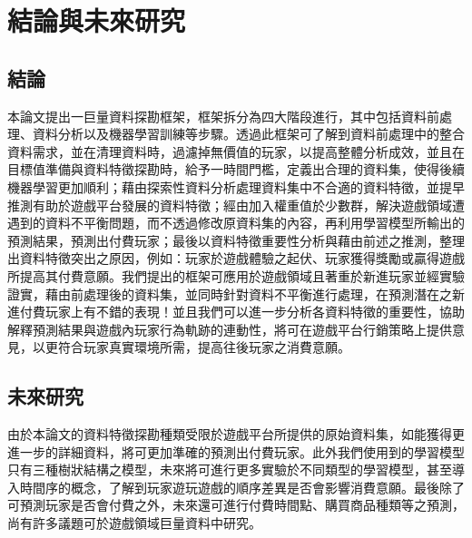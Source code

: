 \chapter{結論與未來研究}
\label{cha:Conclusions}

\section{結論}

本論文提出一巨量資料探勘框架，框架拆分為四大階段進行，其中包括資料前處理、資料分析以及機器學習訓練等步驟。透過此框架可了解到資料前處理中的整合資料需求，並在清理資料時，過濾掉無價值的玩家，以提高整體分析成效，並且在目標值準備與資料特徵探勘時，給予一時間門檻，定義出合理的資料集，使得後續機器學習更加順利；藉由探索性資料分析處理資料集中不合適的資料特徵，並提早推測有助於遊戲平台發展的資料特徵；經由加入權重值於少數群，解決遊戲領域遭遇到的資料不平衡問題，而不透過修改原資料集的內容，再利用學習模型所輸出的預測結果，預測出付費玩家；最後以資料特徵重要性分析與藉由前述之推測，整理出資料特徵突出之原因，例如：玩家於遊戲體驗之起伏、玩家獲得獎勵或贏得遊戲所提高其付費意願。我們提出的框架可應用於遊戲領域且著重於新進玩家並經實驗證實，藉由前處理後的資料集，並同時針對資料不平衡進行處理，在預測潛在之新進付費玩家上有不錯的表現！並且我們可以進一步分析各資料特徵的重要性，協助解釋預測結果與遊戲內玩家行為軌跡的連動性，將可在遊戲平台行銷策略上提供意見，以更符合玩家真實環境所需，提高往後玩家之消費意願。

\section{未來研究}

由於本論文的資料特徵探勘種類受限於遊戲平台所提供的原始資料集，如能獲得更進一步的詳細資料，將可更加準確的預測出付費玩家。此外我們使用到的學習模型只有三種樹狀結構之模型，未來將可進行更多實驗於不同類型的學習模型，甚至導入時間序的概念，了解到玩家遊玩遊戲的順序差異是否會影響消費意願。最後除了可預測玩家是否會付費之外，未來還可進行付費時間點、購買商品種類等之預測，尚有許多議題可於遊戲領域巨量資料中研究。